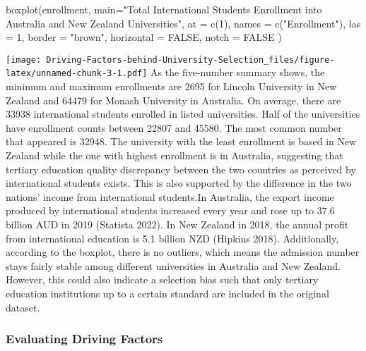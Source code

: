 \documentclass[
]{article}
\newenvironment{Shaded}{\begin{snugshade}}{\end{snugshade}}
\newcommand{\AttributeTok}[1]{\textcolor[rgb]{0.77,0.63,0.00}{#1}}
\newcommand{\ConstantTok}[1]{\textcolor[rgb]{0.00,0.00,0.00}{#1}}
\newcommand{\DecValTok}[1]{\textcolor[rgb]{0.00,0.00,0.81}{#1}}
\newcommand{\FunctionTok}[1]{\textcolor[rgb]{0.00,0.00,0.00}{#1}}
\newcommand{\NormalTok}[1]{#1}
\newcommand{\StringTok}[1]{\textcolor[rgb]{0.31,0.60,0.02}{#1}}
\begin{document}
\begin{Shaded}
\begin{Highlighting}[]
\FunctionTok{boxplot}\NormalTok{(enrollment,}
        \AttributeTok{main=}\StringTok{"Total International Students\textquotesingle{} Enrollment into }
\StringTok{        Australia and New Zealand Universities"}\NormalTok{,}
        \AttributeTok{at =} \FunctionTok{c}\NormalTok{(}\DecValTok{1}\NormalTok{),}
        \AttributeTok{names =} \FunctionTok{c}\NormalTok{(}\StringTok{"Enrollment"}\NormalTok{),}
        \AttributeTok{las =} \DecValTok{1}\NormalTok{,}
        \AttributeTok{border =} \StringTok{"brown"}\NormalTok{,}
        \AttributeTok{horizontal =} \ConstantTok{FALSE}\NormalTok{,}
        \AttributeTok{notch =} \ConstantTok{FALSE}
\NormalTok{)}
\end{Highlighting}
\end{Shaded}

\texttt{[image: Driving-Factors-behind-University-Selection\_files/figure-latex/unnamed-chunk-3-1.pdf]}
As the five-number summary shows, the minimum and maximum enrollments
are 2695 for Lincoln University in New Zealand and 64479 for Monash
University in Australia. On average, there are 33938 international
students enrolled in listed universities. Half of the universities have
enrollment counts between 22807 and 45580. The most common number that
appeared is 32948. The university with the least enrollment is based in
New Zealand while the one with highest enrollment is in Australia,
suggesting that tertiary education quality discrepancy between the two
countries as perceived by international students exists. This is also
supported by the difference in the two nations' income from
international students.In Australia, the export income produced by
international students increased every year and rose up to 37.6 billion
AUD in 2019 (Statista 2022). In New Zealand in 2018, the annual profit
from international education is 5.1 billion NZD (Hipkins 2018).
Additionally, according to the boxplot, there is no outliers, which
means the admission number stays fairly stable among different
universities in Australia and New Zealand. However, this could also
indicate a selection bias such that only tertiary education institutions
up to a certain standard are included in the original dataset.

\hypertarget{evaluating-driving-factors}{%
\subsubsection{Evaluating Driving
Factors}\label{evaluating-driving-factors}}
\end{document}
